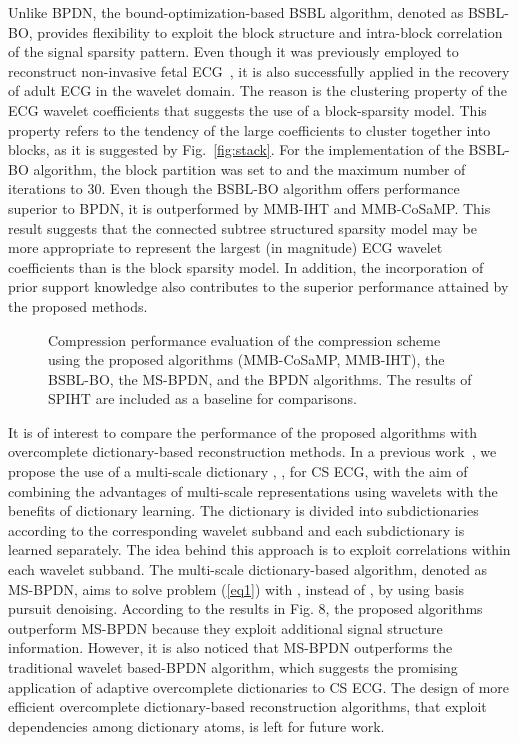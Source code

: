 \documentclass[journal]{IEEEtran}
\begin{document}
Unlike BPDN, the bound-optimization-based BSBL algorithm, denoted as BSBL-BO, provides flexibility to exploit the block structure and  intra-block correlation of the signal sparsity pattern. Even though it was previously employed to reconstruct non-invasive fetal ECG~\cite{Zhan13}, it is also successfully applied in the recovery of adult ECG in the wavelet domain. The reason is the clustering property of the ECG wavelet coefficients that suggests the use of a block-sparsity model. This property refers to the tendency of the large coefficients to cluster together into blocks, as it is suggested by Fig.~\ref{fig:stack}. For the implementation of the BSBL-BO algorithm, the block partition was set to  and the maximum number of iterations to 30. Even though the BSBL-BO algorithm offers performance superior to BPDN, it is outperformed by MMB-IHT and MMB-CoSaMP. This result suggests that the connected subtree structured sparsity model may be more appropriate to represent the largest (in magnitude) ECG wavelet coefficients than is the block sparsity model. In addition, the incorporation of prior support knowledge also contributes to the superior performance attained by the proposed methods.

\begin{figure}[t]
\caption{Compression performance evaluation of the compression scheme using the proposed algorithms (MMB-CoSaMP, MMB-IHT), the BSBL-BO, the MS-BPDN, and the BPDN algorithms. The results of SPIHT are included as a baseline for comparisons.} \label{fig:203}
\end{figure}

It is of interest to compare the performance of the proposed algorithms with overcomplete dictionary-based reconstruction methods. In a previous work~\cite{Pola13}, we propose the use of a multi-scale dictionary , , for CS ECG, with the aim of combining the advantages of multi-scale representations using wavelets with the benefits of dictionary learning. The dictionary  is divided into subdictionaries according to the corresponding wavelet subband and each subdictionary is learned separately. The idea behind this approach is to exploit correlations within each wavelet subband. The multi-scale dictionary-based algorithm, denoted as MS-BPDN, aims to solve problem (\ref{eq1}) with , instead of , by using basis pursuit denoising. According to the results in Fig. 8, the proposed algorithms outperform MS-BPDN because they exploit additional signal structure information. However, it is also noticed that MS-BPDN outperforms the traditional wavelet based-BPDN algorithm, which suggests the promising application of adaptive overcomplete dictionaries to CS ECG. The design of more efficient overcomplete dictionary-based reconstruction algorithms, that exploit dependencies among dictionary atoms, is left for future work.
\end{document}
